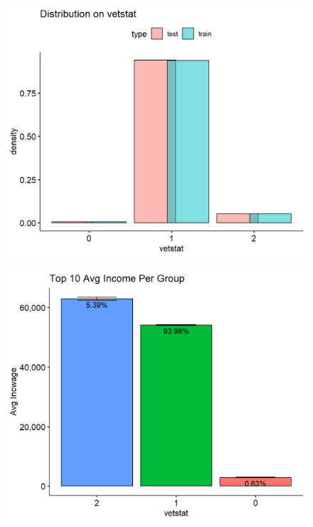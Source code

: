 \documentclass[11pt, letter,twocolumn]{article}
\begin{document}
\begin{figure}[ht]
	\centering
	\label{fig:unnamed-chunk-7-12}
	\includegraphics[width=0.9\linewidth]{imgs/preliminary_analysis/unnamed-chunk-7-12}
\end{figure}
\begin{figure}[ht]
	\centering
	\label{fig:unnamed-chunk-7-13}
	\includegraphics[width=0.9\linewidth]{imgs/preliminary_analysis/unnamed-chunk-7-13}
\end{figure}
\end{document}
